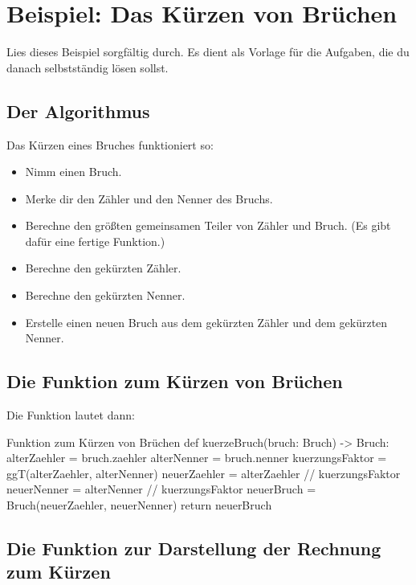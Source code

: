 \section{Beispiel: Das Kürzen von Brüchen}

Lies dieses Beispiel sorgfältig durch. Es dient als Vorlage für die Aufgaben, die du danach selbstständig lösen sollst.

\subsection{Der Algorithmus}

Das Kürzen eines Bruches funktioniert so:
\begin{itemize}
	\item Nimm einen Bruch.
	\item Merke dir den Zähler und den Nenner des Bruchs.
	\item Berechne den größten gemeinsamen Teiler von Zähler und Bruch. (Es gibt dafür eine fertige Funktion.)
	\item Berechne den gekürzten Zähler.
	\item Berechne den gekürzten Nenner.
	\item Erstelle einen neuen Bruch aus dem gekürzten Zähler und dem gekürzten Nenner.
\end{itemize}

\subsection{Die Funktion zum Kürzen von Brüchen}

Die Funktion lautet dann:

\begin{codePython}{Funktion zum Kürzen von Brüchen}
def kuerzeBruch(bruch: Bruch) -> Bruch:
	alterZaehler = bruch.zaehler
	alterNenner = bruch.nenner
	kuerzungsFaktor = ggT(alterZaehler, alterNenner)
	neuerZaehler = alterZaehler // kuerzungsFaktor
	neuerNenner = alterNenner // kuerzungsFaktor
	neuerBruch = Bruch(neuerZaehler, neuerNenner)
	return neuerBruch
\end{codePython}

\subsection{Die Funktion zur Darstellung der Rechnung zum Kürzen}

